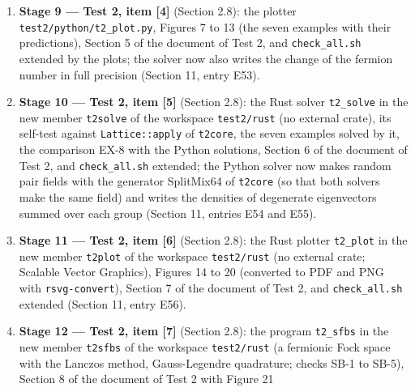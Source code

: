 \documentclass[
  10pt,
]{article}
\begin{document}
\begin{enumerate}
  fewer than three dimensions, and the methods of the self-consistent
  tasks), twelve new registry entries of group 9 (the number of active
  directions, the fermion number and the mean-field energy of a lattice
  state, the matrix of the modes, the quantities of the Anderson
  iteration, the wave packet and the branch projectors, the matrix of
  the free lattice operator on a plane wave, the group velocity, the
  magnetic length, the quench and the amplitude mode, and the Bloch
  vectors of the linearized equations), nineteen new descriptive column
  words, and \texttt{check\_all.sh} extended by the solver, its examples
  and their checks (Section 11, entries E44 to E52).
\item
  \textbf{Stage 9 --- Test 2, item {[}4{]}} (Section 2.8): the plotter
  \texttt{test2/python/t2\_plot.py}, Figures 7 to 13 (the seven examples
  with their predictions), Section 5 of the document of Test 2, and
  \texttt{check\_all.sh} extended by the plots; the solver now also
  writes the change of the fermion number in full precision (Section 11,
  entry E53).
\item
  \textbf{Stage 10 --- Test 2, item {[}5{]}} (Section 2.8): the Rust
  solver \texttt{t2\_solve} in the new member \texttt{t2solve} of the
  workspace \texttt{test2/rust} (no external crate), its self-test
  against \texttt{Lattice::apply} of \texttt{t2core}, the seven examples
  solved by it, the comparison EX-8 with the Python solutions, Section 6
  of the document of Test 2, and \texttt{check\_all.sh} extended; the
  Python solver now makes random pair fields with the generator
  SplitMix64 of \texttt{t2core} (so that both solvers make the same
  field) and writes the densities of degenerate eigenvectors summed over
  each group (Section 11, entries E54 and E55).
\item
  \textbf{Stage 11 --- Test 2, item {[}6{]}} (Section 2.8): the Rust
  plotter \texttt{t2\_plot} in the new member \texttt{t2plot} of the
  workspace \texttt{test2/rust} (no external crate; Scalable Vector
  Graphics), Figures 14 to 20 (converted to PDF and PNG with
  \texttt{rsvg-convert}), Section 7 of the document of Test 2, and
  \texttt{check\_all.sh} extended (Section 11, entry E56).
\item
  \textbf{Stage 12 --- Test 2, item {[}7{]}} (Section 2.8): the program
  \texttt{t2\_sfbs} in the new member \texttt{t2sfbs} of the workspace
  \texttt{test2/rust} (a fermionic Fock space with the Lanczos method,
  Gauss-Legendre quadrature; checks SB-1 to SB-5), Section 8 of the
  document of Test 2 with Figure 21

\end{enumerate}
\end{document}
